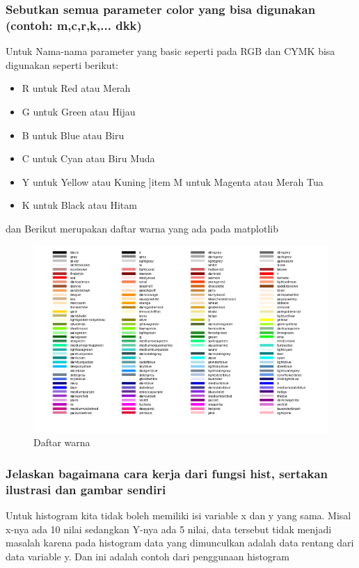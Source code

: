 \subsubsection{Sebutkan semua parameter color yang bisa digunakan (contoh: m,c,r,k,... dkk)}
\hfill \break
Untuk Nama-nama parameter yang basic seperti pada RGB dan CYMK bisa digunakan seperti berikut:
\begin{itemize}
\item R untuk Red atau Merah
\item G untuk Green atau Hijau
\item B untuk Blue atau Biru
\item C untuk Cyan atau Biru Muda
\item Y untuk Yellow atau Kuning
]item M untuk Magenta atau Merah Tua
\item K untuk Black atau Hitam
\end{itemize}
dan Berikut merupakan daftar warna yang ada pada matplotlib
\begin{figure}[ht]	
    \includegraphics[width=13cm]{figures/6/1174083/Teori/warna.png}
    \centering
    \caption{Daftar warna}
    \label{6}
\end{figure}

\subsubsection{Jelaskan bagaimana cara kerja dari fungsi hist, sertakan ilustrasi dan gambar sendiri}
\hfill \break
Untuk histogram kita tidak boleh memiliki isi variable x dan y yang sama. Misal x-nya ada 10 nilai sedangkan Y-nya ada 5 nilai, data tersebut tidak menjadi masalah karena pada histogram data yang dimunculkan adalah data rentang dari data variable y. Dan ini adalah contoh dari penggunaan histogram

